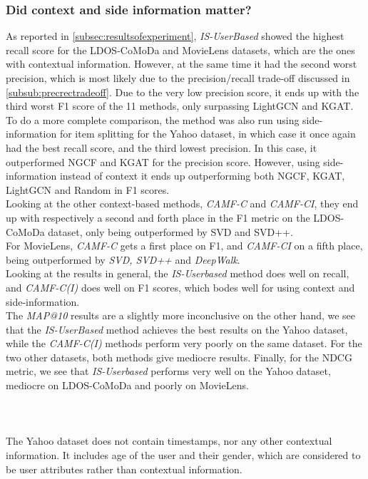 \subsubsection{Did context and side information matter?}
As reported in \autoref{subsec:resultsofexperiment}, \textit{IS-UserBased} showed the highest recall score for the LDOS-CoMoDa and MovieLens datasets, which are the ones with contextual information.
However, at the same time it had the second worst precision, which is most likely due to the precision/recall trade-off discussed in \autoref{subsub:precrectradeoff}.
Due to the very low precision score, it ends up with the third worst F1 score of the 11 methods, only surpassing LightGCN and KGAT.
To do a more complete comparison, the method was also run using side-information for item splitting for the Yahoo dataset, in which case it once again had the best recall score, and the third lowest precision.
In this case, it outperformed NGCF and KGAT for the precision score.
However, using side-information instead of context it ends up outperforming both NGCF, KGAT, LightGCN and Random in F1 scores.\\
Looking at the other context-based methods, \textit{CAMF-C} and \textit{CAMF-CI}, they end up with respectively a second and forth place in the F1 metric on the LDOS-CoMoDa dataset, only being outperformed by SVD and SVD++.\\
For MovieLens, \textit{CAMF-C} gets a first place on F1, and \textit{CAMF-CI} on a fifth place, being outperformed by \textit{SVD, SVD++} and \textit{DeepWalk}.\\
Looking at the results in general, the \textit{IS-Userbased} method does well on recall, and \textit{CAMF-C(I)} does well on F1 scores, which bodes well for using context and side-information.\\
The \textit{MAP@10} results are a slightly more inconclusive on the other hand, we see that the \textit{IS-UserBased} method achieves the best results on the Yahoo dataset, while the \textit{CAMF-C(I)} methods perform very poorly on the same dataset.
For the two other datasets, both methods give mediocre results.
Finally, for the NDCG metric, we see that \textit{IS-Userbased} performs very well on the Yahoo dataset, mediocre on LDOS-CoMoDa and poorly on MovieLens.\\\\
\\\\
The Yahoo dataset does not contain timestamps, nor any other contextual information.
It includes age of the user and their gender, which are considered to be user attributes rather than contextual information.
